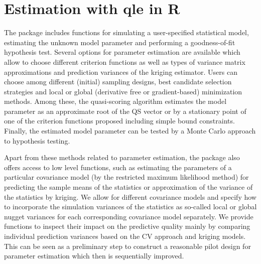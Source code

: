 \documentclass[article, nojss]{jss}
\numberwithin{equation}{section}			%
\begin{document}
\section{Estimation with qle in R}\label{sec:Restim}
The package includes functions for simulating a user-specified statistical
model, estimating the unknown model parameter and performing a goodness-of-fit
hypothesis test. Several options for parameter estimation are available which
allow to choose different criterion functions as well as types of variance matrix
approximations and prediction variances of the kriging estimator.
Users can choose among different (initial) sampling designs, best candidate selection
strategies and local or global (derivative free or gradient-based) minimization methods.
Among these, the quasi-scoring algorithm estimates the model parameter as an approximate
root of the QS vector or by a stationary point of one of the criterion functions
proposed including simple bound constraints. Finally, the estimated model
parameter can be tested by a Monte Carlo approach to hypothesis testing.\par
%
Apart from these methods related to parameter estimation, the package also
offers access to low level functions, such as estimating the parameters of
a particular covariance model (by the restricted maximum likelihood method) for
predicting the sample means of the statistics or approximation of the variance
of the statistics by kriging. We allow for different covariance models and
specify how to incorporate the simulation variances of the statistics as
so-called local or global nugget variances for each corresponding covariance model
separately. We provide functions to inspect their impact on the predictive quality
mainly by comparing individual prediction variances based on the CV approach and
kriging models. This can be seen as a preliminary step to construct a reasonable
pilot design for parameter estimation which then is sequentially improved.\par
% 
\end{document}
